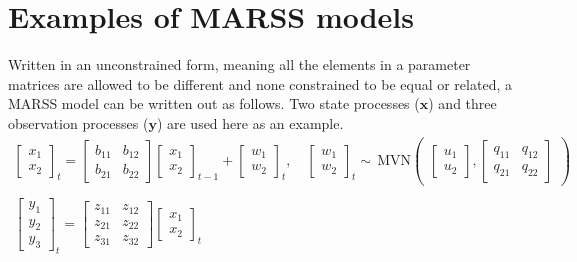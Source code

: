 \documentclass[12pt,]{book}
\begin{document}
\hypertarget{examples-of-marss-models}{%
\section{Examples of MARSS models}\label{examples-of-marss-models}}

Written in an unconstrained form, meaning all the elements in a parameter matrices are allowed to be different and none constrained to be equal or related, a MARSS model can be written out as follows. Two state processes (\(\mathbf{x}\)) and three observation processes (\(\mathbf{y}\)) are used here as an example.
\begin{gather*}
\begin{bmatrix}x_1\\ x_2\end{bmatrix}_t
= \begin{bmatrix}b_{11}&b_{12}\\b_{21}&b_{22}\end{bmatrix}
\begin{bmatrix}x_1\\x_2\end{bmatrix}_{t-1}
+ \begin{bmatrix}w_1\\ w_2\end{bmatrix}_t,\quad 
\begin{bmatrix}w_1\\ w_2\end{bmatrix}_t \sim \,\text{MVN}\begin{pmatrix}\begin{bmatrix}u_1\\u_2\end{bmatrix},\begin{bmatrix}q_{11}&q_{12}\\q_{21}&q_{22}\end{bmatrix} \end{pmatrix}  \\
\\
\begin{bmatrix}y_1\\ y_2\\ y_3\end{bmatrix}_t
= \begin{bmatrix}z_{11}&z_{12}\\ z_{21}&z_{22}\\ z_{31}&z_{32}\end{bmatrix}
\begin{bmatrix}x_1\\ x_2\end{bmatrix}_t

\end{gather*}
\end{document}
